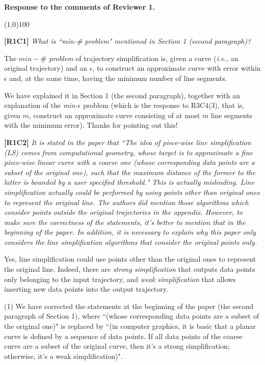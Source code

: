 \documentclass{letter}
\newcommand{\ie}{\emph{i.e.,}\xspace}
\begin{document}
\textbf{Response to the comments of Reviewer 1.}

\line(1,0){100}


\textbf{[R1C1]} \emph{What is ``min-\# problem" mentioned in Section 1 (second paragraph)?}


The \emph{$min-\#$ problem} of trajectory simplification is, given a curve (\ie an original trajectory) and an $\epsilon$, to construct an approximate curve with error within $\epsilon$ and, at the same time, having the minimum number of line segments.

We have explained it in Section 1 (the second paragraph), together with an explanation of the \emph{min-$\epsilon$} problem (which is the response to R3C4(3), that is, given $m$, construct an approximate curve consisting of at most $m$ line segments with the minimum error).
Thanks for pointing out this!

\textbf{[R1C2]} \emph{It is stated in the paper that ``The idea of piece-wise line simplification (LS) comes from computational geometry, whose target is to approximate a fine piece-wise linear curve with a coarse one (whose corresponding data points are a subset of the original one), such that the maximum distance of the former to the latter is bounded by a user specified threshold." This is actually misleading. Line simplification actually could be performed by using points other than original ones to represent the original line. The authors did mention those algorithms which consider points outside the original trajectories in the appendix. However, to make sure the correctness of the statements, it's better to mention that in the beginning of the paper. In addition, it is necessary to explain why this paper only considers the line simplification algorithms that consider the original points only. }

Yes, line simplification could use points other than the original ones to represent the original line. Indeed, there are \emph{strong simplification} that outputs data points only belonging to the input trajectory, and \emph{weak simplification} that allows inserting new data points into the output trajectory.

(1) We have corrected the statements at the beginning of the paper (the second paragraph of Section 1), where ``(whose corresponding data points are a subset of the original one)" is replaced by ``(in computer graphics, it is basic that a planar curve is defined by a sequence of data points. If all data points of the coarse curve are a subset of the original curve, then it's a strong simplification; otherwise, it's a weak simplification)".
\end{document}
